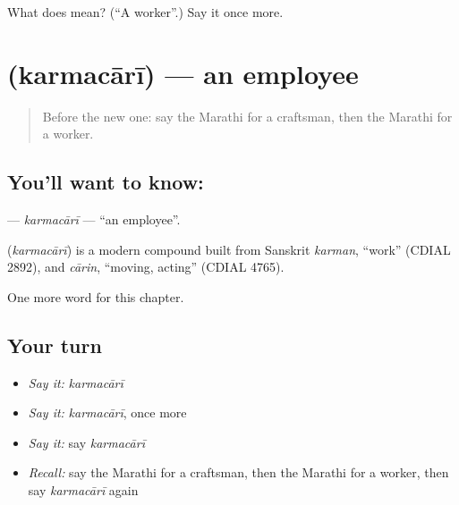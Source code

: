 \begin{tcolorbox}[breakable,colback=teal!4,colframe=teal!35!black,title={Before you move on}]
What does  mean? (\textquotedblleft{}A worker\textquotedblright{}.) Say it once more.
\end{tcolorbox}
\section[\texorpdfstring{\mr{कर्मचारी} (karmacārī)}{कर्मचारी (karmacārī)}]{ (karmacārī) — an employee}

\label{lesson:MR-C210-karmacari}



\begin{quote}
Before the new one: say the Marathi for a craftsman, then the Marathi for a worker.
\end{quote}

\subsection*{You'll want to know: }
\textbf{} — \emph{karmacārī} — \textquotedblleft{}an employee\textquotedblright{}.

\begin{cousinweb}
\textbf{} (\emph{karmacārī}) is a modern compound built from Sanskrit \emph{karman}, \textquotedblleft{}work\textquotedblright{} (CDIAL 2892), and \emph{cārin}, \textquotedblleft{}moving, acting\textquotedblright{} (CDIAL 4765).
\end{cousinweb}

\begin{grammarlens}[title={What you've built}]
One more word for this chapter.
\end{grammarlens}

\subsection*{Your turn}
\begin{itemize}
\raggedright
  \item \emph{Say it:} \emph{karmacārī}
  \item \emph{Say it:} \emph{karmacārī}, once more
  \item \emph{Say it:} say \emph{karmacārī}
  \item \emph{Recall:} say the Marathi for a craftsman, then the Marathi for a worker, then say \emph{karmacārī} again
\end{itemize}

